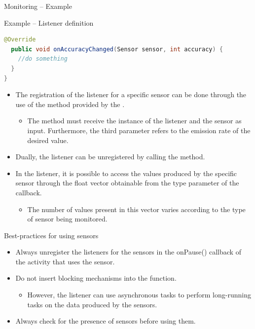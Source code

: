 \documentclass{beamer}
\begin{document}
\begin{frame}{Monitoring -- Example}
\begin{exampleblock}{Example -- Listener definition}
\begin{lstlisting}[language=Java]
  @Override
  public void onAccuracyChanged(Sensor sensor, int accuracy) {
    //do something		
  }
}
      \end{lstlisting}
    \end{exampleblock}
    \begin{itemize}\itemsep10pt
      \item The registration of the listener for a specific sensor can be done
      through the use of the  method provided by the
      .
      \begin{itemize}
        \item The method must receive the instance of the listener and the
        sensor as input. Furthermore, the third parameter refers to the emission
        rate of the desired value.
      \end{itemize}
      \item Dually, the listener can be unregistered by calling the
       method.
      \item In the listener, it is possible to access the values produced by the
      specific sensor through the float vector obtainable from the 
      type parameter of the  callback.
      \begin{itemize}
        \item The number of values present in this vector varies according to
        the type of sensor being monitored.
      \end{itemize}
    \end{itemize}

  \end{frame}

  \begin{frame}{Best-practices for using sensors}
    \begin{itemize}\itemsep20pt
      \item Always unregister the listeners for the sensors in the onPause()
      callback of the activity that uses the sensor.
      \item Do not insert blocking mechanisms into the 
      function.
      \begin{itemize}
        \item However, the listener can use asynchronous tasks to perform
        long-running tasks on the data produced by the sensors.
      \end{itemize}
      \item Always check for the presence of sensors before using them.
    \end{itemize}
  \end{frame}
\end{document}
